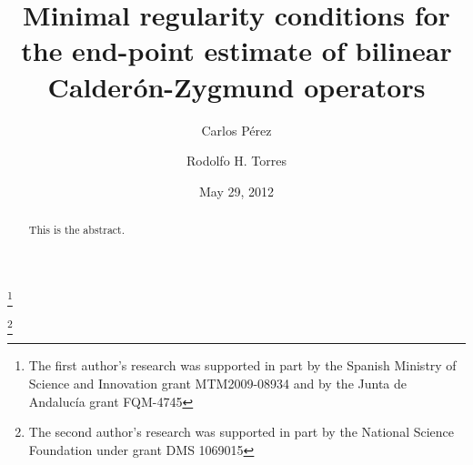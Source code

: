 \documentclass{bproc-l}
\begin{document}

\title [End-point estimate of bilinear Calder\'on-Zygmund operators]
{Minimal regularity  conditions for the end-point estimate of bilinear
  Calder\'on-Zygmund operators}

\author[Carlos P\'erez]{Carlos P\'erez}
\address{Departamento de An\'alisis Matem\'atico, Facultad de Matem\'aticas,
Universidad de Sevilla, 41080 Sevilla, Spain}
\thanks{The first  author's research was  supported in part by the Spanish
  Ministry of Science and Innovation grant MTM2009-08934 and by the
  Junta de Andaluc\'ia grant FQM-4745}

\author[Rodolfo H. Torres]{Rodolfo H. Torres}
\address{Department of Mathematics, University of Kansas, 405 Snow Hall, 1460
Jayhawk Boulevard, Lawrence, Kansas 66045-7523}
\thanks{The   second author's research was supported in part by the
  National Science Foundation under grant DMS 1069015}

\date{May 29, 2012}

\begin{abstract}
This is the abstract.
\end{abstract}

\maketitle
\end{document}
